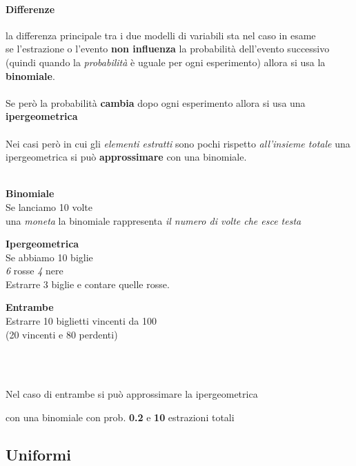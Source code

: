\documentclass[]{article}
\begin{document}
    \paragraph{Differenze} la differenza principale tra i due modelli di variabili sta nel caso in esame \\
    se l'estrazione o l'evento \textbf{non influenza} la probabilità dell'evento successivo (quindi quando la \textit{probabilità} è uguale per ogni esperimento) allora si usa la \textbf{binomiale}. \\ \\
    Se però la probabilità \textbf{cambia} dopo ogni esperimento allora si usa una \textbf{ipergeometrica} \\ \\
    Nei casi però in cui gli \textit{elementi estratti} sono pochi rispetto \textit{all'insieme totale} una ipergeometrica si può \textbf{approssimare} con una binomiale. \\ \\
    \begin{minipage}{0.30\textwidth}
        \textbf{Binomiale} \\
        Se lanciamo 10 volte \\
        una \textit{moneta} la binomiale rappresenta \textit{il numero di volte che esce testa}
    \end{minipage}
    \begin{minipage}{0.30\textwidth}
        \textbf{Ipergeometrica} \\
        Se abbiamo 10 biglie \\
        \textit{6} rosse \textit{4} nere \\
        Estrarre 3 biglie e contare quelle rosse.
    \end{minipage}
    \begin{minipage}{0.30\textwidth}
        \textbf{Entrambe} \\
        Estrarre 10 biglietti vincenti
        da 100 \\
        (20 vincenti e 80 perdenti)
    \end{minipage} \\ \\

    \centerline{Nel caso di entrambe si può approssimare la ipergeometrica}
    \centerline{con una binomiale con prob. \textbf{0.2} e \textbf{10} estrazioni totali} 

    \subsection{Uniformi}
\end{document}

